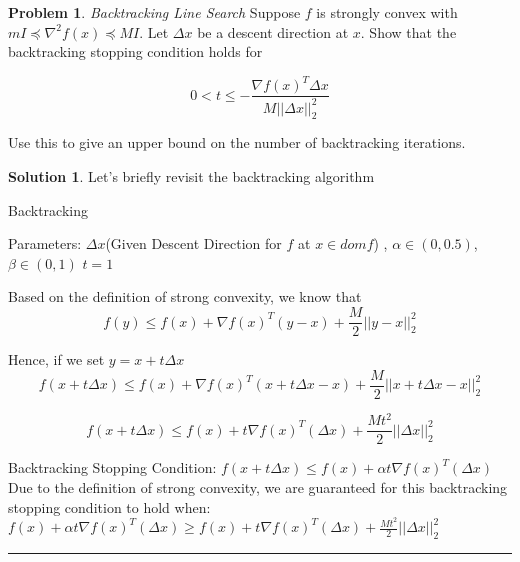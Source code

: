 \documentclass{article}
\theoremstyle{definition}
\newtheorem{problem}{Problem}
\def\fline{\rule{0.75\linewidth}{0.5pt}}
\newcommand{\finishline}{\begin{center}\fline\end{center}}
\newtheorem*{solution*}{Solution}
\newenvironment{solution}{\begin{solution*}}{{\finishline} \end{solution*}}
\begin{document}
\begin{problem} \textit{Backtracking Line Search} Suppose $f$ is strongly convex with $mI \preceq \nabla^2f(x) \preceq MI$. Let $\Delta x$ be a descent direction at $x$. Show that the backtracking stopping condition holds for

\begin{equation}
                        \label{eq:example}
                            0 < t \leq -\frac{\nabla f(x)^T \Delta x}{M ||\Delta x||^2_2}
                    \end{equation}

Use this to give an upper bound on the number of backtracking iterations. 

\begin{solution} Let's briefly revisit the backtracking algorithm 

\begin{algorithm}
\caption{Backtracking}
\begin{algorithmic} 
\STATE Parameters: $\Delta x$(Given Descent Direction for $f$ at $x \in dom f$) , $\alpha \in (0, 0.5)$, $\beta \in (0, 1)$
\STATE $t = 1$

\ENDWHILE

\end{algorithmic}
\end{algorithm}

Based on the definition of strong convexity, we know that \newline 
\begin{equation}
    \label{eq:example}
        f(y) \leq f(x) + \nabla f(x)^T (y - x) + \frac{M}{2} ||y - x||^2_2
\end{equation}

Hence, if we set $y = x + t\Delta x$ 
\begin{equation}
    \label{eq:example}
        f(x + t\Delta x) \leq f(x) + \nabla f(x)^T (x + t\Delta x - x) + \frac{M}{2} ||x + t\Delta x - x||^2_2
\end{equation}

\begin{equation}
    \label{eq:example}
        f(x + t\Delta x) \leq f(x) + t\nabla f(x)^T (\Delta x) + \frac{Mt^2}{2} ||\Delta x||^2_2
\end{equation}

Backtracking Stopping Condition: $f(x + t\Delta x) \leq f(x) + \alpha t\nabla f(x)^T (\Delta x)$ \newline 
Due to the definition of strong convexity, we are guaranteed for this backtracking stopping condition to hold when: \newline 
$f(x) + \alpha t\nabla f(x)^T (\Delta x) \geq f(x) + t\nabla f(x)^T (\Delta x) + \frac{Mt^2}{2} ||\Delta x||^2_2$ 


\end{solution}
\end{problem}
\end{document}
